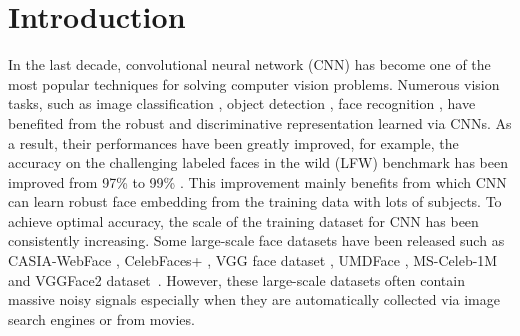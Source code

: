 \documentclass[journal,transmag]{IEEEtran}
\begin{document}
\IEEEdisplaynontitleabstractindextext







%
\IEEEpeerreviewmaketitle



\section{Introduction}


In the last decade, convolutional neural network (CNN) has become one of the most popular techniques for solving computer vision problems. Numerous vision tasks, such as image classification \cite{HeZRS16}, object detection \cite{DBLP:journals/corr/RedmonDGF15}, face recognition \cite{DBLP:conf/icb/LeiCHLL07, sun2014deep, taigman2014deepface, yi2014learning}, have benefited from the robust and discriminative representation learned via CNNs. As a result, their performances have been greatly improved, for example, the accuracy on the challenging labeled faces in the wild (LFW) benchmark has been improved from 97\% \cite{taigman2014deepface} to 99\% \cite{parkhi2015deep, schroff2015facenet, sun2014deep}. This improvement mainly benefits from which CNN can learn robust face embedding from the training data with lots of subjects. To achieve optimal accuracy, the scale of the training dataset for CNN has been consistently increasing. Some large-scale face datasets have been released such as CASIA-WebFace \cite{yi2014learning}, CelebFaces+ \cite{sun2014deep}, VGG face dataset \cite{parkhi2015deep}, UMDFace \cite{bansal2016umdfaces,bansal2017s}, MS-Celeb-1M \cite{DBLP:journals/corr/GuoZHHG16} and VGGFace2 dataset~\cite{DBLP:journals/corr/abs-1710-08092}. However, these large-scale datasets often contain massive noisy signals especially when they are automatically collected via image search engines or from movies.
\end{document}
